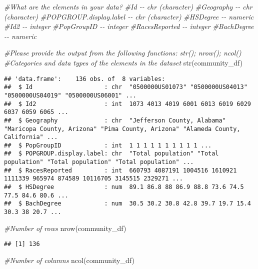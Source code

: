 \documentclass[
]{article}
\newenvironment{Shaded}{\begin{snugshade}}{\end{snugshade}}
\newcommand{\CommentTok}[1]{\textcolor[rgb]{0.56,0.35,0.01}{\textit{#1}}}
\newcommand{\FunctionTok}[1]{\textcolor[rgb]{0.00,0.00,0.00}{#1}}
\newcommand{\NormalTok}[1]{#1}
\begin{document}
\begin{Shaded}
\begin{Highlighting}[]
\CommentTok{\#What are the elements in your data?}
\CommentTok{\#Id {-}{-} chr (character)}
\CommentTok{\#Geography {-}{-} chr (character)}
\CommentTok{\#POPGROUP.display.label {-}{-} chr (character)}
\CommentTok{\#HSDegree {-}{-} numeric}
\CommentTok{\#Id2 {-}{-} integer}
\CommentTok{\#PopGroupID {-}{-} integer}
\CommentTok{\#RacesReported {-}{-} integer}
\CommentTok{\#BachDegree {-}{-} numeric}

\CommentTok{\#Please provide the output from the following functions: str(); nrow(); ncol()}
\CommentTok{\#Categories and data types of the elements in the dataset}
\FunctionTok{str}\NormalTok{(community\_df)}
\end{Highlighting}
\end{Shaded}

\begin{verbatim}
## 'data.frame':    136 obs. of  8 variables:
##  $ Id                    : chr  "0500000US01073" "0500000US04013" "0500000US04019" "0500000US06001" ...
##  $ Id2                   : int  1073 4013 4019 6001 6013 6019 6029 6037 6059 6065 ...
##  $ Geography             : chr  "Jefferson County, Alabama" "Maricopa County, Arizona" "Pima County, Arizona" "Alameda County, California" ...
##  $ PopGroupID            : int  1 1 1 1 1 1 1 1 1 1 ...
##  $ POPGROUP.display.label: chr  "Total population" "Total population" "Total population" "Total population" ...
##  $ RacesReported         : int  660793 4087191 1004516 1610921 1111339 965974 874589 10116705 3145515 2329271 ...
##  $ HSDegree              : num  89.1 86.8 88 86.9 88.8 73.6 74.5 77.5 84.6 80.6 ...
##  $ BachDegree            : num  30.5 30.2 30.8 42.8 39.7 19.7 15.4 30.3 38 20.7 ...
\end{verbatim}

\begin{Shaded}
\begin{Highlighting}[]
\CommentTok{\#Number of rows}
\FunctionTok{nrow}\NormalTok{(community\_df)}
\end{Highlighting}
\end{Shaded}

\begin{verbatim}
## [1] 136
\end{verbatim}

\begin{Shaded}
\begin{Highlighting}[]
\CommentTok{\#Number of columns}
\FunctionTok{ncol}\NormalTok{(community\_df)}
\end{Highlighting}
\end{Shaded}
\end{document}
